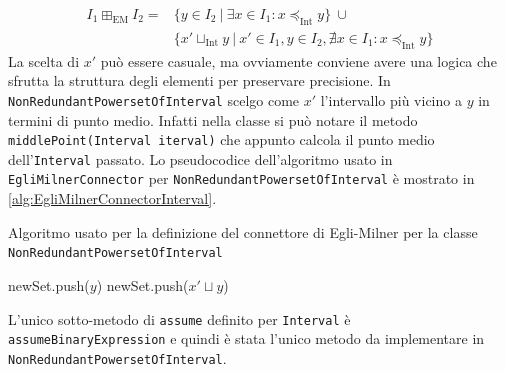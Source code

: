 \begin{align*}
 I_1 \boxplus_{\textrm{EM}} I_2 = &\{ y \in I_2\ |\ \exists x \in I_1 : x \preceq_{\textrm{Int}} y \}\ \cup \\
 &\{ x' \sqcup_{\textrm{Int}} y\ |\ x' \in I_1, y \in I_2, \nexists x \in I_1 : x \preceq_{\textrm{Int}} y \}
\end{align*}
La scelta di \(x'\) può essere casuale, ma ovviamente conviene avere una logica che sfrutta la struttura degli elementi per preservare precisione. In \texttt{NonRedundantPowersetOfInterval} scelgo come \(x'\) l'intervallo più vicino a \(y\) in termini di punto medio. Infatti nella classe si può notare il metodo \texttt{middlePoint(Interval iterval)} che appunto calcola il punto medio dell'\texttt{Interval} passato. Lo pseudocodice dell'algoritmo usato in \texttt{EgliMilnerConnector} per \texttt{NonRedundantPowersetOfInterval} è mostrato in \ref{alg:EgliMilnerConnectorInterval}.
\begin{algorithm}
	\caption{Algoritmo usato per la definizione del connettore di Egli-Milner per la classe \texttt{NonRedundantPowersetOfInterval}}
	\label{alg:EgliMilnerConnectorInterval}
	\begin{algorithmic}[1]
                \State newSet.push({$y$})
            \Else
                \State newSet.push($x'\sqcup y$)
            \EndIf
        \EndFor
        \State {}
	\EndFunction
	\end{algorithmic}
\end{algorithm}

\noindent L'unico sotto-metodo di \texttt{assume} definito per \texttt{Interval} è \texttt{assumeBinaryExpression} e quindi è stata l'unico metodo da implementare in \texttt{NonRedundantPowersetOfInterval}.


